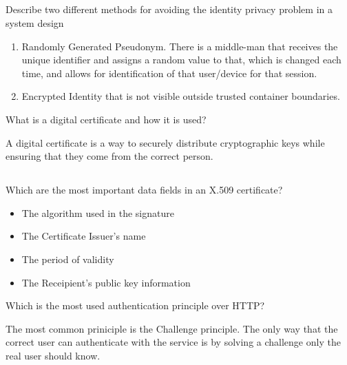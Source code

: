 \begin{questions}
  \begin{parts}
  \part{} Describe two different methods for avoiding the identity privacy problem in a system design
    \begin{solution}
      \begin{enumerate}[noitemsep]
      \item Randomly Generated Pseudonym.
        There is a middle-man that receives the unique identifier and assigns a random value to that, which is changed each time, and allows for identification of that user/device for that session.
      \item Encrypted Identity that is not visible outside trusted container boundaries.
      \end{enumerate}
    \end{solution}
  \end{parts}

\question{} What is a digital certificate and how it is used?
  \begin{solution}
    A digital certificate is a way to securely distribute cryptographic keys while ensuring that they come from the correct person.
  \end{solution}

  \begin{parts}
  \part{} Which are the most important data fields in an X.509 certificate?
    \begin{solution}
      \begin{itemize}[noitemsep]
      \item The algorithm used in the signature
      \item The Certificate Issuer's name
      \item The period of validity
      \item The Receipient's public key information
      \end{itemize}
    \end{solution}
  \end{parts}

\question{} Which is the most used authentication principle over HTTP?\@
  \begin{solution}
    The most common priniciple is the Challenge principle.
    The only way that the correct user can authenticate with the service is by solving a challenge only the real user should know.
  \end{solution}


\end{questions}
